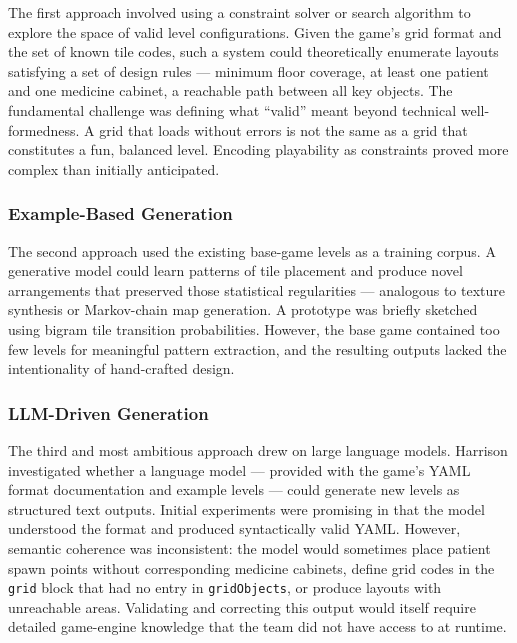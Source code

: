 The first approach involved using a constraint solver or search
algorithm to explore the space of valid level configurations. Given the
game's grid format and the set of known tile codes, such a system could
theoretically enumerate layouts satisfying a set of design rules ---
minimum floor coverage, at least one patient and one medicine cabinet, a
reachable path between all key objects. The fundamental challenge was
defining what ``valid'' meant beyond technical well-formedness. A grid
that loads without errors is not the same as a grid that constitutes a
fun, balanced level. Encoding playability as constraints proved more
complex than initially anticipated.

\subsubsection{Example-Based Generation}\label{example-based-generation}

The second approach used the existing base-game levels as a training
corpus. A generative model could learn patterns of tile placement and
produce novel arrangements that preserved those statistical regularities
--- analogous to texture synthesis or Markov-chain map generation. A
prototype was briefly sketched using bigram tile transition
probabilities. However, the base game contained too few levels for
meaningful pattern extraction, and the resulting outputs lacked the
intentionality of hand-crafted design.

\subsubsection{LLM-Driven Generation}\label{llm-driven-generation}

The third and most ambitious approach drew on large language models.
Harrison investigated whether a language model --- provided with the
game's YAML format documentation and example levels --- could generate
new levels as structured text outputs. Initial experiments were
promising in that the model understood the format and produced
syntactically valid YAML. However, semantic coherence was inconsistent:
the model would sometimes place patient spawn points without
corresponding medicine cabinets, define grid codes in the \texttt{grid}
block that had no entry in \texttt{gridObjects}, or produce layouts with
unreachable areas. Validating and correcting this output would itself
require detailed game-engine knowledge that the team did not have access
to at runtime.

